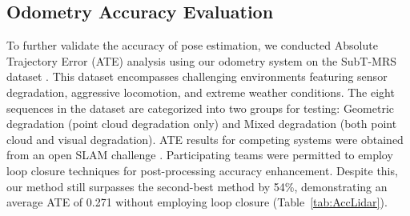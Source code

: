 



\subsection{Odometry Accuracy Evaluation} %
To further validate the accuracy of pose estimation, we conducted Absolute Trajectory Error (ATE) analysis using our odometry system \cite{zhao2021super} on the SubT-MRS dataset \cite{Zhao2024CVPR}. This dataset encompasses challenging environments featuring sensor degradation, aggressive locomotion, and extreme weather conditions. The eight sequences in the dataset are categorized into two groups for testing: Geometric degradation (point cloud degradation only) and Mixed degradation (both point cloud and visual degradation). ATE results for competing systems were obtained from an open SLAM challenge \cite{Zhao2024CVPR}. Participating teams were permitted to employ loop closure techniques for post-processing accuracy enhancement. Despite this, our method still surpasses the second-best method by 54\%, demonstrating an average ATE of 0.271 without employing loop closure (Table~\ref{tab:AccLidar}). 
